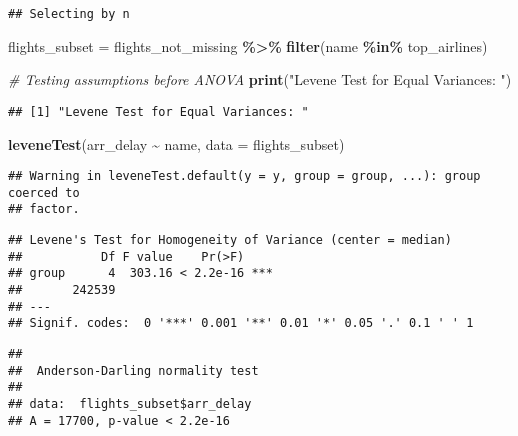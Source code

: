 \documentclass[
]{article}
\newenvironment{Shaded}{\begin{snugshade}}{\end{snugshade}}
\newcommand{\AttributeTok}[1]{\textcolor[rgb]{0.13,0.29,0.53}{#1}}
\newcommand{\CommentTok}[1]{\textcolor[rgb]{0.56,0.35,0.01}{\textit{#1}}}
\newcommand{\FunctionTok}[1]{\textcolor[rgb]{0.13,0.29,0.53}{\textbf{#1}}}
\newcommand{\NormalTok}[1]{#1}
\newcommand{\OtherTok}[1]{\textcolor[rgb]{0.56,0.35,0.01}{#1}}
\newcommand{\SpecialCharTok}[1]{\textcolor[rgb]{0.81,0.36,0.00}{\textbf{#1}}}
\newcommand{\StringTok}[1]{\textcolor[rgb]{0.31,0.60,0.02}{#1}}
\begin{document}
\begin{verbatim}
## Selecting by n
\end{verbatim}

\begin{Shaded}
\begin{Highlighting}[]
\NormalTok{flights\_subset }\OtherTok{=}\NormalTok{ flights\_not\_missing }\SpecialCharTok{\%\textgreater{}\%}
  \FunctionTok{filter}\NormalTok{(name }\SpecialCharTok{\%in\%}\NormalTok{ top\_airlines)}

\CommentTok{\# Testing assumptions before ANOVA}
\FunctionTok{print}\NormalTok{(}\StringTok{"Levene Test for Equal Variances: "}\NormalTok{)}
\end{Highlighting}
\end{Shaded}

\begin{verbatim}
## [1] "Levene Test for Equal Variances: "
\end{verbatim}

\begin{Shaded}
\begin{Highlighting}[]
\FunctionTok{leveneTest}\NormalTok{(arr\_delay }\SpecialCharTok{\textasciitilde{}}\NormalTok{ name, }\AttributeTok{data =}\NormalTok{ flights\_subset)}
\end{Highlighting}
\end{Shaded}

\begin{verbatim}
## Warning in leveneTest.default(y = y, group = group, ...): group coerced to
## factor.
\end{verbatim}

\begin{verbatim}
## Levene's Test for Homogeneity of Variance (center = median)
##           Df F value    Pr(>F)    
## group      4  303.16 < 2.2e-16 ***
##       242539                      
## ---
## Signif. codes:  0 '***' 0.001 '**' 0.01 '*' 0.05 '.' 0.1 ' ' 1
\end{verbatim}

\begin{Shaded}
\end{Shaded}

\begin{verbatim}
## 
##  Anderson-Darling normality test
## 
## data:  flights_subset$arr_delay
## A = 17700, p-value < 2.2e-16
\end{verbatim}
\end{document}
